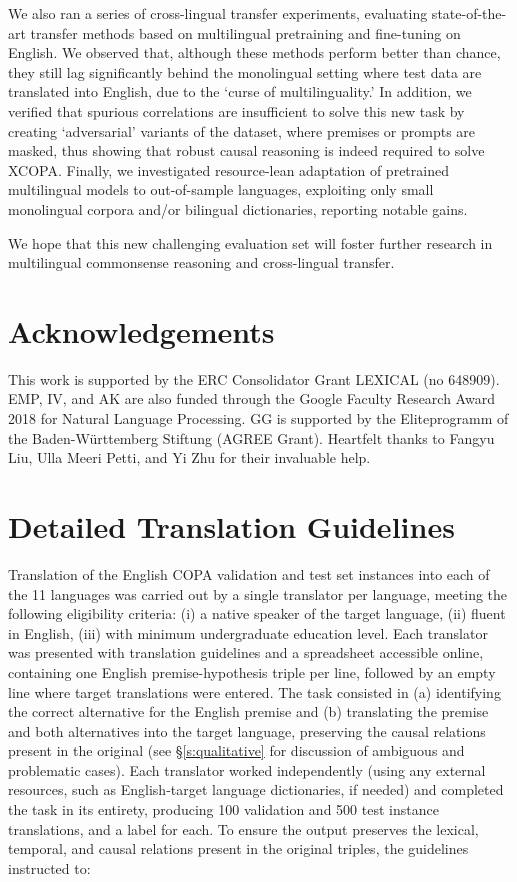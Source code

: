 \documentclass[11pt,a4paper]{article}
\begin{document}
We also ran a series of cross-lingual transfer experiments, evaluating state-of-the-art transfer methods based on multilingual pretraining and fine-tuning on English. We observed that, although these methods perform better than chance, they still lag significantly behind the monolingual setting where test data are translated into English, due to the `curse of multilinguality.' In addition, we verified that spurious correlations are insufficient to solve this new task by creating `adversarial' variants of the dataset, where premises or prompts are masked, thus showing that robust causal reasoning is indeed required to solve XCOPA.
Finally, we investigated resource-lean adaptation of pretrained multilingual models to out-of-sample languages, exploiting only small monolingual corpora and/or bilingual dictionaries, reporting notable gains.

We hope that this new challenging evaluation set will foster further research in multilingual commonsense reasoning and cross-lingual transfer.



%
 
\section*{Acknowledgements}
This work is supported by the ERC Consolidator Grant LEXICAL (no 648909). EMP, IV, and AK are also funded through the Google Faculty Research Award 2018 for Natural Language Processing. GG is supported by the Eliteprogramm of the Baden-W\"{u}rttemberg Stiftung (AGREE Grant). Heartfelt thanks to Fangyu Liu, Ulla Meeri Petti, and Yi Zhu for their invaluable help.




\clearpage
\appendix
\section{Detailed Translation Guidelines}
\label{ss:dataguide}
Translation of the English COPA validation and test set instances into each of the 11 languages was carried out by a single translator per language, meeting the following eligibility criteria: (i) a native speaker of the target language, (ii) fluent in English, (iii) with minimum undergraduate education level. Each translator was presented with translation guidelines and a spreadsheet accessible online, containing one English premise-hypothesis triple per line, followed by an empty line where target translations were entered. The task consisted in (a) identifying the correct alternative for the English premise and (b) translating the premise and both alternatives into the target language, preserving the causal relations present in the original (see \S\ref{s:qualitative} for discussion of ambiguous and problematic cases). Each translator worked independently (using any external resources, such as English-target language dictionaries, if needed) and completed the task in its entirety, producing 100 validation and 500 test instance translations, and a label for each. To ensure the output preserves the lexical, temporal, and causal relations present in the original triples, the guidelines instructed to:
\end{document}
